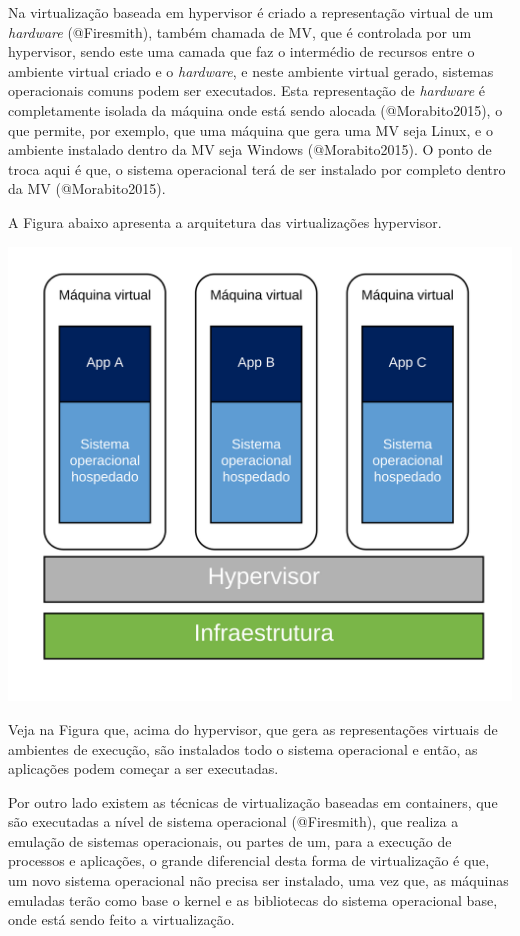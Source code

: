 \documentclass[]{article}
\begin{document}
Na virtualização baseada em hypervisor é criado a representação virtual de um \emph{hardware} (@Firesmith), também chamada de MV, que é controlada por um hypervisor, sendo este uma camada que faz o intermédio de recursos entre o ambiente virtual criado e o \emph{hardware}, e neste ambiente virtual gerado, sistemas operacionais comuns podem ser executados. Esta representação de \emph{hardware} é completamente isolada da máquina onde está sendo alocada (@Morabito2015), o que permite, por exemplo, que uma máquina que gera uma MV seja Linux, e o ambiente instalado dentro da MV seja Windows (@Morabito2015). O ponto de troca aqui é que, o sistema operacional terá de ser instalado por completo dentro da MV (@Morabito2015).

A Figura abaixo apresenta a arquitetura das virtualizações hypervisor.

\includegraphics{res/1_intro/hypervisor_overview.svg}

Veja na Figura que, acima do hypervisor, que gera as representações virtuais de ambientes de execução, são instalados todo o sistema operacional e então, as aplicações podem começar a ser executadas.

Por outro lado existem as técnicas de virtualização baseadas em containers, que são executadas a nível de sistema operacional (@Firesmith), que realiza a emulação de sistemas operacionais, ou partes de um, para a execução de processos e aplicações, o grande diferencial desta forma de virtualização é que, um novo sistema operacional não precisa ser instalado, uma vez que, as máquinas emuladas terão como base o kernel e as bibliotecas do sistema operacional base, onde está sendo feito a virtualização.
\end{document}
